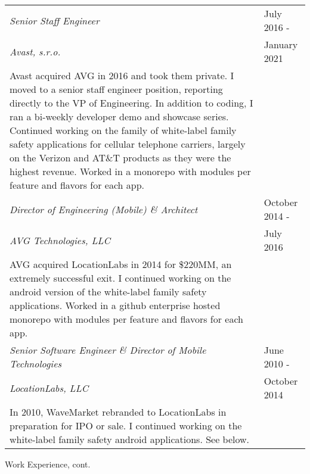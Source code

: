 \begin{tabular}{p{5.2in}@{\hspace{1.5cm}}l}

	\em Senior Staff Engineer	    & July 2016 -  \\
	\em  Avast, s.r.o. 	& January 2021 \\[4pt]
	
	   Avast acquired AVG in 2016 and took them private.  I moved to a senior staff engineer position,
	   reporting directly to the VP of Engineering.  In addition to coding, I ran a bi-weekly developer demo
	   and showcase series.
	   Continued working on the family of white-label family safety applications for cellular
	   telephone carriers, largely on the Verizon and AT\&T products as they were the highest revenue. 
	   Worked in a monorepo with modules per feature and flavors for each app. \\[9pt]
	   
	\em Director of Engineering (Mobile)	 \& Architect & October 2014 -  \\
	\em  AVG Technologies, LLC 	& July 2016 \\[4pt]
	
	   AVG acquired LocationLabs in 2014 for \$220MM, an extremely successful exit.   I 
	   continued working on the android version of the white-label family safety applications. 
	   Worked in a github enterprise hosted monorepo with modules per feature and flavors for each app.\\[9pt]
	   
	\em Senior Software Engineer \& Director of Mobile Technologies    & June 2010 -  \\
	\em  LocationLabs, LLC	& October 2014 \\[4pt]
	
	   In 2010, WaveMarket rebranded to LocationLabs in preparation for IPO or sale.
	   I continued working on the white-label family safety android applications. See below. \\[9pt]
	   

\end{tabular}

\newpage
\begin{bf} \large
Work Experience, cont.
\end{bf}
\medskip

